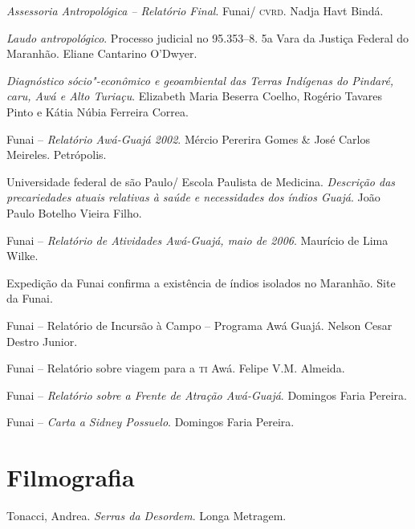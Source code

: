 \begin{itemize}
{\item[2000] \emph{Assessoria Antropológica -- Relatório Final}. Funai/
\textsc{cvrd}. Nadja Havt Bindá.

\item[2001] \emph{Laudo antropológico}. Processo judicial no
95.353--8. 5a Vara da Justiça Federal do Maranhão. Eliane Cantarino
O'Dwyer.

\item[2001] \emph{Diagnóstico sócio"-econômico e geoambiental das
Terras Indígenas do Pindaré, caru, Awá e Alto Turiaçu}. Elizabeth Maria
Beserra Coelho, Rogério Tavares Pinto e Kátia Núbia Ferreira Correa.

\item[2002] Funai -- \emph{Relatório Awá-Guajá 2002}. Mércio Pererira
Gomes \& José Carlos Meireles. Petrópolis.

\item[2002] Universidade federal de são Paulo/ Escola Paulista de
Medicina. \emph{Descrição das precariedades atuais relativas à saúde e
necessidades dos índios Guajá}. João Paulo Botelho Vieira Filho.

\item[2006] Funai -- \emph{Relatório de Atividades Awá-Guajá, maio de
2006}. Maurício de Lima Wilke.

\item[2009] Expedição da Funai confirma a existência de índios
isolados no Maranhão. Site da Funai.

\item[2013] Funai -- Relatório de Incursão à Campo -- Programa Awá
Guajá. Nelson Cesar Destro Junior.

\item[2013] Funai -- Relatório sobre viagem para a \textsc{ti} Awá. Felipe V.M.
Almeida.

\item[s/d] Funai -- \emph{Relatório sobre a Frente de Atração
Awá-Guajá}. Domingos Faria Pereira.

\item[s/d] Funai -- \emph{Carta a Sidney Possuelo}. Domingos Faria
Pereira.

\section{Filmografia}

\item[2006] Tonacci, Andrea. \emph{Serras da Desordem}. Longa Metragem.
}
\end{itemize}

